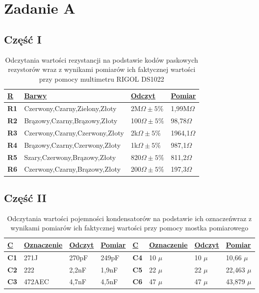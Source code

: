 \documentclass[polish,polish,a4paper]{article}
\begin{document}
\section{}%
\section{Zadanie A}
\subsection{Część I}
\begin{table}[!h]
\centering
\begin{tabular}{|y|l|l|l|}
\hline
{}
\textbf{\underline{R}} & \textbf{\underline{Barwy}} & \textbf{\underline{Odczyt}} &\textbf{\underline{Pomiar}} \\
\hline
\textbf{R1} & Czerwony,Czarny,Zielony,Złoty & 2M$\Omega \pm 5\%$ &
1,99M$\Omega$
\\
\hline
\textbf{R2} & Brązowy,Czarny,Brązowy,Złoty & 100$\Omega \pm 5\%$ &
98,78$\Omega$
\\
\hline
\textbf{R3} & Czerwony,Czarny,Czerwony,Złoty & 2k$\Omega \pm 5\%$ &
1964,1$\Omega$
\\
\hline
\textbf{R4} & Brązowy,Czarny,Czerwony,Złoty & 1k$\Omega \pm 5\%$ &
987,1$\Omega$
\\
\hline
\textbf{R5} & Szary,Czerwony,Brązowy,Złoty & 820$\Omega \pm 5\%$ &
811,2$\Omega$
\\
\hline
\textbf{R6} & Czerwony,Czarny,Brązowy,Złoty & 200$\Omega \pm 5\%$ &
197,3$\Omega$
\\
\hline

\end{tabular}
\caption{Odczytania wartości rezystancji na podstawie kodów paskowych rezystorów wraz z wynikami pomiarów ich faktycznej wartości przy pomocy multimetru RIGOL DS1022}
\end{table}

\subsection{Część II}
\begin{table}[!h]
\centering
\begin{tabular}{|y|l|l|l|y|l|l|l|}
\hline
{}
\textbf{\underline{C}} & \textbf{\underline{Oznaczenie}} & \textbf{\underline{Odczyt}} & \textbf{\underline{Pomiar}} & \textbf{\underline{C}} & \textbf{\underline{Oznaczenie}} & \textbf{\underline{Odczyt}} & \textbf{\underline{Pomiar}} \\
\hline
\textbf{C1} & 271J & 270pF & 249pF &
\textbf{C4} & 10 $\mu$ & 10 $\mu$ & 10,66 $\mu$ \\
\hline
\textbf{C2} & 222 & 2,2nF & 1,9nF &
\textbf{C5} & 22 $\mu$ & 22 $\mu$ & 22,463 $\mu$ \\
\hline
\textbf{C3} & 472AEC & 4,7nF & 4,5nF &
\textbf{C6} & 47 $\mu$ & 47 $\mu$ & 43,879 $\mu$ \\
\hline

\end{tabular}
\caption{Odczytania wartości pojemności kondensatorów na podstawie ich oznaczeńwraz z wynikami pomiarów ich faktycznej wartości przy pomocy mostka pomiarowego}
\end{table}
\end{document}
